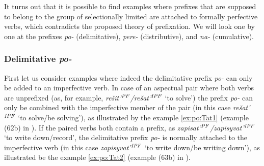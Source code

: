 It turns out that it is possible to find examples where prefixes that are supposed to belong to the group of selectionally limited are attached to formally perfective verbs, which contradicts the proposed theory of prefixation. We will look one by one at the prefixes \textit{po-} (delimitative), \textit{pere-} (distributive), and \textit{na-} (cumulative). 

\subsubsection{Delimitative \textit{po-}}
First let us consider examples where indeed the delimitative prefix \textit{po-} can only be added to an imperfective verb. In case of an aspectual pair where both verbs are unprefixed (as, for example, \textit{re\v{s}it'$^{\mathit{PF}}$/re\v{s}at'$^{\mathit{IPF}}$} `to solve') the prefix \textit{po-} can only be combined with the imperfective member of the pair (in this case \textit{re\v{s}at'$^{\mathit{IPF}}$} `to solve/be solving'), as illustrated by the example \ref{ex:po:Tat1} (example (62b) in \citealt[121]{Tatevosov:09}). If the paired verbs both contain a prefix, as \textit{zapisat'$^{\mathit{PF}}$/zapisyvat'$^{\mathit{IPF}}$} `to write down/record', the delimitative prefix \textit{po-} is normally attached to the imperfective verb (in this case \textit{zapisyvat'$^{\mathit{IPF}}$} `to write down/be writing down'), as illustrated be the example \ref{ex:po:Tat2} (example (63b) in \citealt[121]{Tatevosov:09}).

